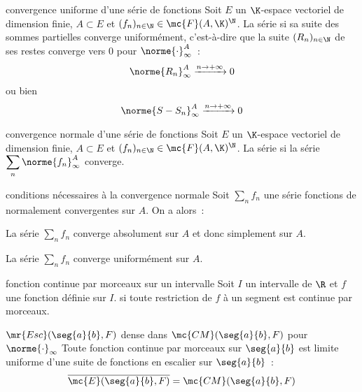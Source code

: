 \begin{adjustwidth}{-3cm}{-3cm}
\begin{definition}{9.19}{convergence uniforme d'une série de fonctions}
    Soit $E$ un $\K$-espace vectoriel de dimension finie, $A \subset E$ et $(f_n)_{n \in \N} \in \mc{F}(A,\K)^\N$. La série  si sa suite des sommes partielles converge uniformément, c’est-à-dire que la suite $(R_n)_{n \in \N}$ de ses restes converge vers $0$ pour $\norme{\cdot}_\infty^A$~:
    $$\norme{R_n}_\infty^A \xrightarrow{n \to + \infty} 0$$
    ou bien
    $$\norme{S - S_n}_\infty^A \xrightarrow{n \to + \infty} 0$$
\end{definition}

\begin{definition}{9.20}{convergence normale d'une série de fonctions}
    Soit $E$ un $\K$-espace vectoriel de dimension finie, $A \subset E$ et $(f_n)_{n \in \N} \in \mc{F}(A,\K)^\N$. La série  si la série $\displaystyle \sum_n \norme{f_n}_\infty^A$ converge.
\end{definition}

\begin{proposition}{9.25}{conditions nécessaires à la convergence normale}
    Soit $\sum_n f_n$ une série fonctions de normalement convergentes sur $A$. On a alors~:
    \begin{enumeratebf}
        \item La série $\sum_n f_n$ converge absolument sur $A$ et donc simplement sur $A$.
        \item La série $\sum_n f_n$ converge uniformément sur $A$.
    \end{enumeratebf}
\end{proposition}

\begin{definition}{9.40}{fonction continue par morceaux sur un intervalle}
    Soit $I$ un intervalle de $\R$ et $f$ une fonction définie sur $I$.  si toute restriction de $f$ à un segment est continue par morceaux.
\end{definition}

\begin{theoreme}{9.43}{$\mr{Esc}(\seg{a}{b},F)$ dense dans $\mc{CM}(\seg{a}{b},F)$ pour $\norme{\cdot}_\infty$}
    Toute fonction continue par morceaux sur $\seg{a}{b}$ est limite uniforme d'une suite de fonctions en escalier sur $\seg{a}{b}$~:
    $$\overline{\mc{E}(\seg{a}{b},F)} = \mc{CM}(\seg{a}{b},F)$$
\end{theoreme}


\end{adjustwidth}
